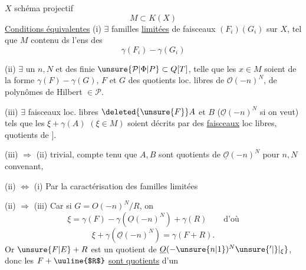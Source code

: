 $X$ schéma projectif
\[
M\subset K(X)
\]
\uline{Conditions équivalentes} \quad (i) $\exists$ familles \uline{limitées} de faisceaux  $(F_i)(G_i)$ sur $X$, tel que $M$ contenu ds l'ens des
\[
\gamma(F_i)-\gamma(G_i)
\]

(ii) $\exists$ un $n,N$ et des  finie   $\unsure{\mathcal P|\Phi|P}\subset Q[T]$, telle que les $x\in M$ soient de la forme $\gamma(F)-\gamma(G)$, $F$ et $G$ des quotients loc. libres de $\mathcal O(-n)^N$, de polynômes de Hilbert $\in\mathcal P$.

(iii)  $\exists$  faisceaux loc. libres $\deleted{\unsure{F}}A$ et $B$ ($\underline{\mathcal O}(-n)^N$ si on veut) tels que les $\xi+\gamma(A)$ $(\xi\in M)$ soient décrits par des \uline{faisceaux} loc libres, quotients de   $]$.

(iii) $\Longrightarrow$ (ii) trivial, compte tenu que $A,B$ sont quotients de $\underline{\mathcal O}(-n)^N$ pour $n,N$ convenant,

(ii) $\Longleftrightarrow$ (i) \quad Par la caractérisation des familles limitées

(ii) $\Longrightarrow$ (iii) \quad Car si $G=O(-n)^N/R$, on 
\[
\xi=\gamma(F)-\gamma(\underline O(-n)^N)+\gamma(R)\qquad\text{d'où}
\]
\[
\xi+\gamma(\underline{\mathcal O}(-n)^N)=\gamma(F+R).
\]
Or $\unsure{F|E}+R$ est un quotient de $\underline O(-\unsure{n|1})^{N}\unsure{'|\}|_{\xi}}$, donc les $F+\text{\uuline{$R$}}$ \uline{sont quotients} d'un

